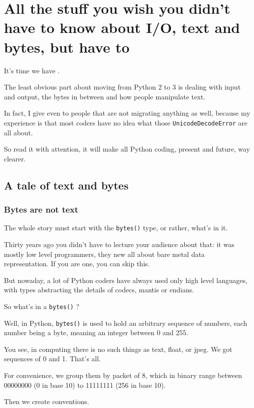 \chapter{All the stuff you wish you didn't have to know about I/O, text and bytes, but have to}\label{chap:text_and_bytes}

It's time we have .

The least obvious part about moving from Python 2 to 3 is dealing with input and output, the bytes in between and how people manipulate text.

In fact, I give  even to people that are not migrating anything as well, because my experience is that most coders have no idea what those \lstinline{UnicodeDecodeError} are all about.

So read it with attention, it will make all Python coding, present and future, way clearer.

\section{A tale of text and bytes}

\subsection{Bytes are not text}

The whole story must start with the \lstinline{bytes()} type, or rather, what's in it.

Thirty years ago you didn't have to lecture your audience about that: it was mostly low level programmers, they new all about bare metal data representation. If you are one, you can skip this.

But nowaday, a lot of Python coders have always used only high level languages, with types abstracting the details of codecs, mantis or endians.

So what's in a \lstinline{bytes()} ?

Well, in Python, \lstinline{bytes()} is used to hold an arbitrary sequence of numbers, each number being a byte, meaning an integer between 0 and 255.

You see, in computing there is no such things as text, float, or jpeg. We got sequences of 0 and 1. That's all.

For convenience, we group them by packet of 8, which in binary range between 00000000 (0 in base 10) to 11111111 (256 in base 10).

Then we create conventions.

